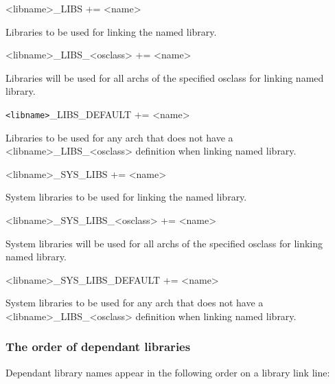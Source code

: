 \begin{description}
\item

\item \textless{}libname\textgreater{}\_LIBS += \textless{}name\textgreater{}

Libraries to be used for linking the named library.

\item \textless{}libname\textgreater{}\_LIBS\_\textless{}osclass\textgreater{} += \textless{}name\textgreater{}

Libraries will be used for all archs of the specified osclass for linking named library.

\item \verb|<libname>|\_LIBS\_DEFAULT += \textless{}name\textgreater{}

Libraries to be used for any arch that does not have a \textless{}libname\textgreater{}\_LIBS\_\textless{}osclass\textgreater{} definition when linking 
named library.

\item

\item \textless{}libname\textgreater{}\_SYS\_LIBS += \textless{}name\textgreater{}

System libraries to be used for linking the named library.

\item \textless{}libname\textgreater{}\_SYS\_LIBS\_\textless{}osclass\textgreater{} += \textless{}name\textgreater{}

System libraries will be used for all archs of the specified osclass for linking named library.

\item \textless{}libname\textgreater{}\_SYS\_LIBS\_DEFAULT += \textless{}name\textgreater{}

System libraries to be used for any arch that does not have a \textless{}libname\textgreater{}\_LIBS\_\textless{}osclass\textgreater{} definition when 
linking named library.

\end{description}

\subsubsection{The order of dependant libraries}

Dependant library names appear in the following order on a library link line:

